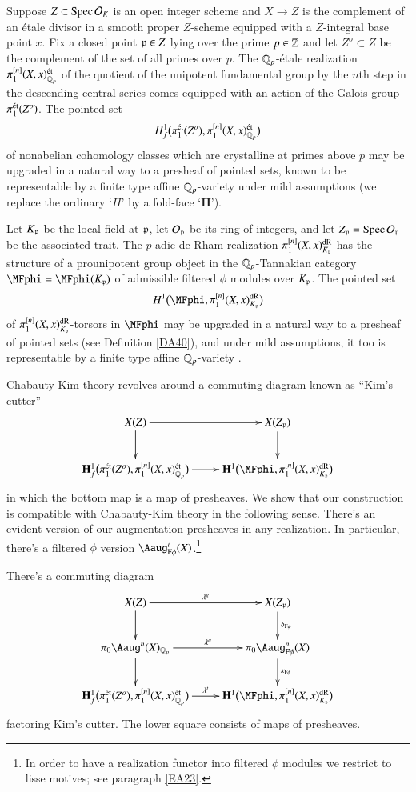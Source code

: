 Suppose $Z \subset \operatorname{Spec} \mathcal{O}_K$ is an open integer scheme and $X \to Z$ is the complement of an \'etale divisor in a smooth proper $Z$-scheme equipped with a $Z$-integral base point $x$. Fix a closed point $\mathfrak{p} \in Z$ lying over the prime $p \in \mathbb{Z}$ and let $Z^o \subset Z$ be the complement of the set of all primes over $p$. The ${\mathbb{Q}_p}$-\'etale realization $\pi_1^{[n]}(X,x)_{\mathbb{Q}_p}^{\textrm {\'et}}$ of the quotient of the unipotent fundamental group by the $n$th step in the descending central series comes equipped with an action of the Galois group $\pi^{\textrm {\'et}}_1(Z^o)$. The pointed set
\[
H^1_f \big( 
\pi_1^{\textrm {\'et}}(Z^o), 
\pi_1^{[n]}(X,x)_{\mathbb{Q}_p}^{\textrm {\'et}}
\big)
\]
of nonabelian cohomology classes which are crystalline at primes above $p$ may be upgraded in a natural way to a presheaf of pointed sets, known to be representable by a finite type affine ${\mathbb{Q}_p}$-variety under mild assumptions \cite{kimii} (we replace the ordinary `$H$' by a fold-face `$\mathbf{H}$'). 

Let $K_{\mathfrak{p}}$ be the local field at $\mathfrak{p}$, let $\mathcal{O}_{\mathfrak{p}}$ be its ring of integers, and let $Z_{\mathfrak{p}} = \operatorname{Spec} \mathcal{O}_{\mathfrak{p}}$ be the associated trait. The $p$-adic de Rham realization $\pi_1^{[n]}(X,x)^{\rm {dR}}_{K_{\mathfrak{p}}}$ has the structure of a prounipotent group object in the ${\mathbb{Q}_p}$-Tannakian category $\MFphi = \MFphi(K_\pP)$ of admissible filtered $\phi$ modules over $K_{\mathfrak{p}}$. The pointed set
\[
H^1 \big( \MFphi, \pi_1^{[n]}(X,x)^\dR_{K_\pP} \big)
\]
of $\pi_1^{[n]}(X,x)^{\rm {dR}}_{K_{\mathfrak{p}}}$-torsors in $\MFphi$ may be upgraded in a natural way to a presheaf of pointed sets (see Definition \ref{DA40}), and under mild assumptions, it too is representable by a finite type affine ${\mathbb{Q}_p}$-variety \cite{kimii}.

Chabauty-Kim theory \cite{kimi, kimii, nats} revolves around a commuting diagram known as ``Kim's cutter''
\[
\xymatrix{
X(Z) \ar[r] \ar[d] & X(Z_\pP) \ar[d] 
\\
\mathbf{H}^1_f \big( 
\pi_1^\et(Z^o), 
\pi_1^{[n]}(X,x)_\Qp^\et
\big) \ar[r]
&
\mathbf{H}^1 \big( \MFphi, \pi_1^{[n]}(X,x)^\dR_{K_\pP} \big)
}
\]
in which the bottom map is a map of presheaves. We show that our construction is compatible with Chabauty-Kim theory in the following sense. There's an evident version of our augmentation presheaves in any realization. In particular, there's a filtered $\phi$ version $\Aaug_{\Fphi}^i(X)$.\footnote{In order to have a realization functor into filtered $\phi$ modules we restrict to lisse motives; see paragraph \ref{EA23}.} 

\begin{ssTheorem}
\label{IN13}
There's a commuting diagram
\[
\xymatrix{
X(Z) \ar[r]^-{\la^g} \ar[d] & X(Z_\pP) \ar[d]^{\de_\Fphi}
\\
\pi_0\Aaug^n(X)_\Qp \ar[d] \ar[r]^-{\la^a}
&
\pi_0\Aaug^n_{\Fphi}(X) \ar[d]^-{\ka_\Fphi}
\\
\mathbf{H}^1_f \big(\pi_1^\et(Z^o), \pi_1^{[n]}(X,x)^\et_\Qp \big) \ar[r]^-{\la^t}
&
\mathbf{H}^1 \big( \MFphi, \pi_1^{[n]}(X,x)^\dR_{K_\pP} \big)
}
\]
factoring Kim's cutter. The lower square consists of maps of presheaves. 
\end{ssTheorem}

